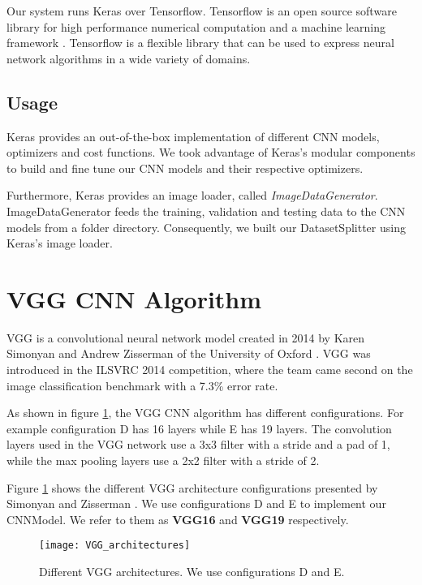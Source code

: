 Our system runs Keras over Tensorflow. Tensorflow is an open source software library for high performance numerical computation and a machine learning framework \cite{tensorflow2015-whitepaper}. Tensorflow is a flexible library that can be used to express neural network algorithms in a wide variety of domains.

\subsection{Usage}
Keras provides an out-of-the-box implementation of different CNN models, optimizers and cost functions. We took advantage of Keras's modular components to build and fine tune our CNN models and their respective optimizers.

Furthermore, Keras provides an image loader, called \textit{ImageDataGenerator}. ImageDataGenerator feeds the training, validation and testing data to the CNN models from a folder directory. Consequently, we built our DatasetSplitter using Keras's image loader.


\section{VGG CNN Algorithm}\label{sec:vgg_algorithm}
VGG is a convolutional neural network model created in 2014 by Karen Simonyan and Andrew Zisserman of the University of Oxford \cite{simonyan2014very}. VGG was introduced in the ILSVRC 2014 competition, where the team came second on the image classification benchmark with a 7.3\% error rate.

As shown in figure \ref{fig:VGG_architectures}, the VGG CNN algorithm has different configurations. For example configuration D has 16 layers while E has 19 layers. The convolution layers used in the VGG network use a 3x3 filter with a stride and a pad of 1, while the max pooling layers use a 2x2 filter with a stride of 2.

Figure \ref{fig:VGG_architectures} shows the different VGG architecture configurations presented by Simonyan and Zisserman \cite{simonyan2014very}. We use configurations D and E to implement our CNNModel. We refer to them as \textbf{VGG16} and \textbf{VGG19} respectively.

\begin{figure}[H]
\centering
  \texttt{[image: VGG\_architectures]}
\caption{Different VGG architectures. We use configurations D and E.}
\label{fig:VGG_architectures}
\end{figure}


